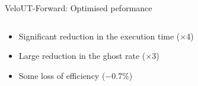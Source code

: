 \documentclass[aspectratio=1610]{beamer}
\begin{document}
\begin{frame}{VeloUT-Forward: Optimised peformance}

\begin{columns}
\begin{column}{0.65\textwidth}
\begin{itemize}
  \item Significant reduction in the execution time ($\times$4)
  \item Large reduction in the ghost rate ($\times$3)
  \item Some loss of efficiency ($-0.7$\%)
\end{itemize}

\bigskip

\begin{mdframed}[linecolor=barcolor]
\begin{center}
\end{center}
\end{mdframed}
\end{column}


\end{columns}
\end{frame}
\end{document}
